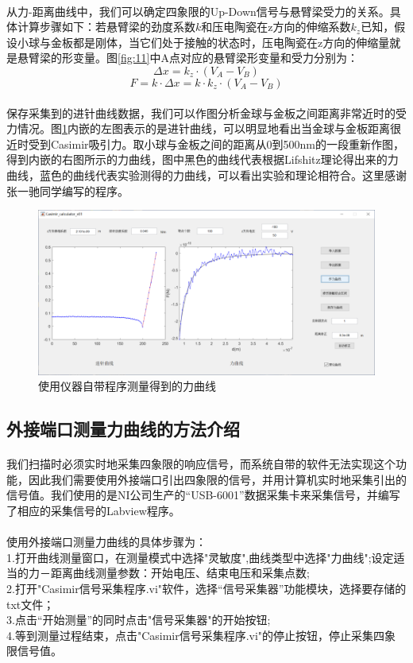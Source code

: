 \paragraph*{}
从力-距离曲线中，我们可以确定四象限的Up-Down信号与悬臂梁受力的关系。具体计算步骤如下：若悬臂梁的劲度系数$k$和压电陶瓷在z方向的伸缩系数$k_z$已知，假设小球与金板都是刚体，当它们处于接触的状态时，压电陶瓷在z方向的伸缩量就是悬臂梁的形变量。图\ref{fig:11}中A点对应的悬臂梁形变量和受力分别为：
$$
\Delta x=k_z\cdot(V_A-V_B)
$$
$$
F=k\cdot \Delta x= k\cdot k_z\cdot(V_A-V_B)
$$
\paragraph*{}
保存采集到的进针曲线数据，我们可以作图分析金球与金板之间距离非常近时的受力情况。图\ref{fig:12}内嵌的左图表示的是进针曲线，可以明显地看出当金球与金板距离很近时受到Casimir吸引力。取小球与金板之间的距离从0到500nm的一段重新作图，得到内嵌的右图所示的力曲线，图中黑色的曲线代表根据Lifshitz理论得出来的力曲线，蓝色的曲线代表实验测得的力曲线，可以看出实验和理论相符合。这里感谢张一驰同学编写的程序。
\begin{figure}
	\centering
	\includegraphics[scale=0.5]{figures/zyc力曲线}
	\caption{使用仪器自带程序测量得到的力曲线}
	\label{fig:12}
\end{figure}
\subsection{外接端口测量力曲线的方法介绍}
\paragraph*{}
我们扫描时必须实时地采集四象限的响应信号，而系统自带的软件无法实现这个功能，因此我们需要使用外接端口引出四象限的信号，并用计算机实时地采集引出的信号值。我们使用的是NI公司生产的“USB-6001”数据采集卡来采集信号，并编写了相应的采集信号的Labview程序。
\paragraph*{}
使用外接端口测量力曲线的具体步骤为：
\\1.打开曲线测量窗口，在测量模式中选择"灵敏度",曲线类型中选择"力曲线";设定适当的力－距离曲线测量参数：开始电压、结束电压和采集点数;
\\2.打开"Casimir信号采集程序.vi"软件，选择“信号采集器”功能模块，选择要存储的txt文件；
\\3.点击“开始测量”的同时点击"信号采集器"的开始按钮;
\\4.等到测量过程结束，点击"Casimir信号采集程序.vi"的停止按钮，停止采集四象限信号值。

